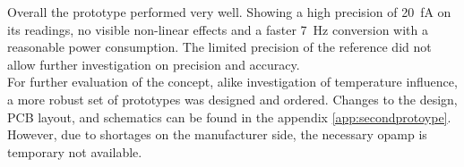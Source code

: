 Overall the prototype performed very well. Showing a high precision of \SI{20}{\femto\ampere} on its readings, no visible non-linear effects and a faster \SI{7}{\hertz} conversion with a reasonable power consumption. The limited precision of the reference did not allow further investigation on precision and accuracy.\\

For further evaluation of the concept, alike investigation of temperature influence, a more robust set of prototypes was designed and ordered. Changes to the design, PCB layout, and schematics can be found in the appendix \ref{app:secondprotoype}. However, due to shortages on the manufacturer side, the necessary \ac{opamp} is temporary not available. 